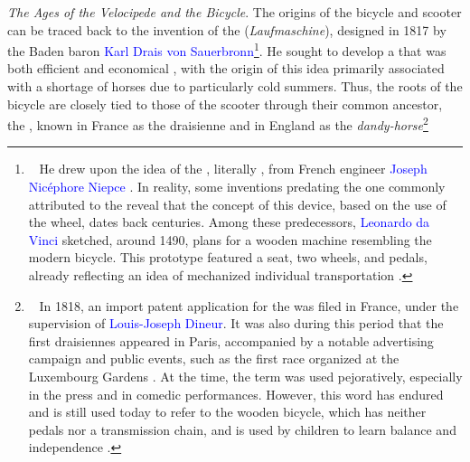 \begin{refsegment}
\textsl{The Ages of the Velocipede and the Bicycle}. The origins of the bicycle and scooter can be traced back to the invention of the  (\textsl{Laufmaschine}), designed in 1817 by the Baden baron \textcolor{blue}{Karl Drais von Sauerbronn}\footnote{~
    He drew upon the idea of the , literally , from French engineer \textcolor{blue}{Joseph Nicéphore Niepce} \textcolor{blue}{\autocite{puech_bicyclette_2016}}. In reality, some inventions predating the one commonly attributed to the  reveal that the concept of this device, based on the use of the wheel, dates back centuries. Among these predecessors, \textcolor{blue}{Leonardo da Vinci} sketched, around 1490, plans for a wooden machine resembling the modern bicycle. This prototype featured a seat, two wheels, and pedals, already reflecting an idea of mechanized individual transportation \textcolor{blue}{\autocite[9]{hills_bicycle_2004}}.
}. He sought to develop a  that was both efficient and economical \textcolor{blue}{\autocite[24]{heran_retour_2015}}, with the origin of this idea primarily associated with a shortage of horses due to particularly cold summers. Thus, the roots of the bicycle are closely tied to those of the scooter through their common ancestor, the , known in France as the draisienne and in England as the \textsl{dandy-horse}\footnote{~
    In 1818, an import patent application for the  was filed in France, under the supervision of \textcolor{blue}{Louis-Joseph Dineur}. It was also during this period that the first draisiennes appeared in Paris, accompanied by a notable advertising campaign and public events, such as the first race organized at the Luxembourg Gardens \textcolor{blue}{\autocite[141]{kobayashi_histoire_1993}}. At the time, the term  was used pejoratively, especially in the press and in comedic performances. However, this word has endured and is still used today to refer to the wooden bicycle, which has neither pedals nor a transmission chain, and is used by children to learn balance and independence \textcolor{blue}{\autocite[21]{jouenne_quest-ce_2022}}.
}
\end{refsegment}
